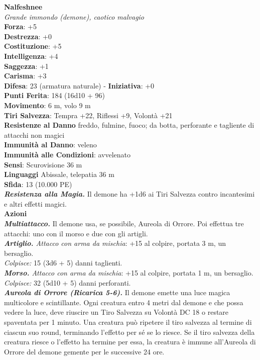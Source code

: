 \begin{multicols}{2}
\medskip\textbf{Nalfeshnee}\\
\emph{Grande immondo (demone), caotico malvagio}\\
\textbf{Forza}: +5\\
\textbf{Destrezza}: +0\\
\textbf{Costituzione}: +5\\
\textbf{Intelligenza}: +4\\
\textbf{Saggezza}: +1\\
\textbf{Carisma}: +3\\
\textbf{Difesa}: 23 (armatura naturale) - \textbf{Iniziativa}: +0\\
\textbf{Punti Ferita}: 184 (16d10 + 96)\\
\textbf{Movimento}: 6 m, volo 9 m\\
\textbf{Tiri Salvezza}: Tempra +22, Riflessi +9, Volontà +21\\
\textbf{Resistenze al Danno} freddo, fulmine, fuoco; da botta, perforante e tagliente di attacchi non magici\\
\textbf{Immunità al Danno}: veleno\\
\textbf{Immunità alle Condizioni}: avvelenato\\
\textbf{Sensi}: Scurovisione 36 m\\
\textbf{Linguaggi} Abissale, telepatia 36 m \\
\textbf{Sfida}: 13 (10.000 PE)\smallskip\\
\emph{\textbf{Resistenza alla Magia.}} Il demone ha +1d6 ai Tiri Salvezza contro incantesimi e altri effetti magici.\\
\smallskip\textbf{Azioni}\\
\emph{\textbf{Multiattacco.}} Il demone usa, se possibile, Aureola di Orrore. Poi effettua tre attacchi: uno con il morso e due con gli artigli.\\
\emph{\textbf{Artiglio.} Attacco con arma da mischia}: +15 al colpire, portata 3 m, un bersaglio.\\
\emph{Colpisce:} 15 (3d6 + 5) danni taglienti.\\
\emph{\textbf{Morso.} Attacco con arma da mischia}: +15 al colpire, portata 1 m, un bersaglio.\\
\emph{Colpisce:} 32 (5d10 + 5) danni perforanti.\\
\emph{\textbf{Aureola di Orrore (Ricarica 5-6).}} Il demone emette una luce magica multicolore e scintillante. Ogni creatura entro 4 metri dal demone e che possa vedere la luce, deve riuscire un Tiro Salvezza su Volontà DC  18 o restare spaventata per 1 minuto. Una creatura può ripetere il tiro salvezza al termine di ciascun suo round, terminando l'effetto per sé se lo riesce. Se il tiro salvezza della creatura riesce o l'effetto ha termine per essa, la creatura è immune all'Aureola di Orrore del demone gemente per le successive 24 ore.\\

\end{multicols}
